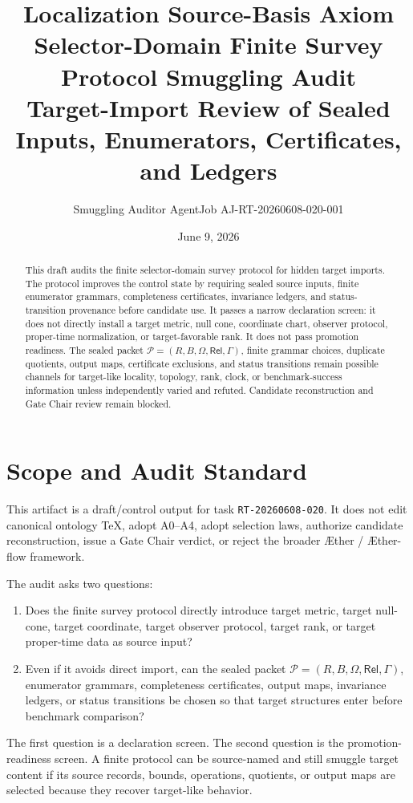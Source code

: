 \documentclass[11pt]{article}
\title{\textbf{Localization Source-Basis Axiom Selector-Domain Finite Survey Protocol Smuggling Audit}\\[0.35em]
\large Target-Import Review of Sealed Inputs, Enumerators, Certificates, and Ledgers}
\author{Smuggling Auditor AgentJob AJ-RT-20260608-020-001}
\date{June 9, 2026}
\newcommand{\Aether}{\AE{}ther}
\newcommand{\Aflow}{\AE{}ther-flow}
\newcommand{\TheoryProgram}{\Aether{} / \Aflow{} framework}
\newcommand{\Pack}{\mathcal{P}}
\newcommand{\Rel}{\mathsf{Rel}}
\begin{document}
\maketitle

\begin{abstract}
This draft audits the finite selector-domain survey protocol for hidden
target imports. The protocol improves the control state by requiring sealed
source inputs, finite enumerator grammars, completeness certificates,
invariance ledgers, and status-transition provenance before candidate use.
It passes a narrow declaration screen: it does not directly install a target
metric, null cone, coordinate chart, observer protocol, proper-time
normalization, or target-favorable rank. It does not pass promotion
readiness. The sealed packet \(\Pack=(R,B,\Omega,\Rel,\Gamma)\), finite
grammar choices, duplicate quotients, output maps, certificate exclusions,
and status transitions remain possible channels for target-like locality,
topology, rank, clock, or benchmark-success information unless independently
varied and refuted. Candidate reconstruction and Gate Chair review remain
blocked.
\end{abstract}

\section{Scope and Audit Standard}

This artifact is a draft/control output for task \texttt{RT-20260608-020}.
It does not edit canonical ontology TeX, adopt A0--A4, adopt selection laws,
authorize candidate reconstruction, issue a Gate Chair verdict, or reject
the broader \TheoryProgram{}.

The audit asks two questions:
\begin{enumerate}
    \item Does the finite survey protocol directly introduce target metric,
    target null-cone, target coordinate, target observer protocol, target
    rank, or target proper-time data as source input?
    \item Even if it avoids direct import, can the sealed packet
    \(\Pack=(R,B,\Omega,\Rel,\Gamma)\), enumerator grammars, completeness
    certificates, output maps, invariance ledgers, or status transitions be
    chosen so that target structures enter before benchmark comparison?
\end{enumerate}

The first question is a declaration screen. The second question is the
promotion-readiness screen. A finite protocol can be source-named and still
smuggle target content if its source records, bounds, operations, quotients,
or output maps are selected because they recover target-like behavior.
\end{document}
